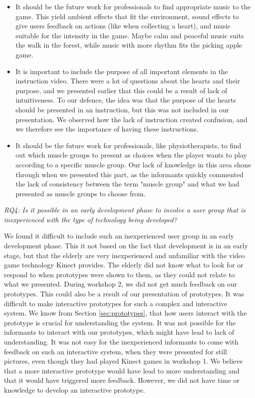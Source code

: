 \begin{itemize}
\item It should be the future work for professionals to find appropriate music to the game. This yield ambient effects that fit the environment, sound effects to give users feedback on actions (like when collecting a heart), and music suitable for the intensity in the game. Maybe calm and peaceful music suits the walk in the forest, while music with more rhythm fits the picking apple game. 
\item It is important to include the purpose of all important elements in the instruction video. There were a lot of questions about the hearts and their purpose, and we presented earlier that this could be a result of lack of intuitiveness. To our defence, the idea was that the purpose of the hearts should be presented in an instruction, but this was not included in our presentation. We observed how the lack of instruction created confusion, and we therefore see the importance of having these instructions.  
\item It should be the future work for professionals, like physiotherapists, to find out which muscle groups to present as choices when the player wants to play according to a specific muscle group. Our lack of knowledge in this area shone through when we presented this part, as the informants quickly commented the lack of consistency between the term "muscle group" and what we had presented as muscle groups to choose from. 
\end{itemize}

\emph{RQ4: Is it possible in an early development phase to involve a user group that is inexperienced with the type of technology being developed?}

We found it difficult to include such an inexperienced user group in an early development phase. This it not based on the fact that development is in an early stage, but that the elderly are very inexperienced and unfamiliar with the video game technology Kinect provides. The elderly did not know what to look for or respond to when prototypes were shown to them, as they could not relate to what we presented. During workshop 2, we did not get much feedback on our prototypes. This could also be a result of our presentation of prototypes. It was difficult to make interactive prototypes for such a complex and interactive system. We know from Section \ref{sec:prototypes}, that how users interact with the prototype is crucial for understanding the system. It was not possible for the informants to interact with our prototypes, which might have lead to lack of understanding. It was not easy for the inexperienced informants to come with feedback on such an interactive system, when they were presented for still pictures, even though they had played Kinect games in workshop 1. We believe that a more interactive prototype would have lead to more understanding and that it would have triggered more feedback. However, we did not have time or knowledge to develop an interactive prototype. 
 

